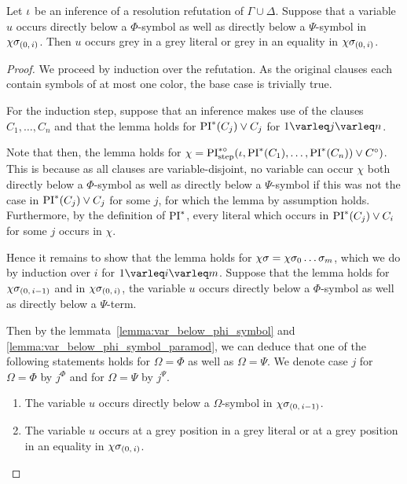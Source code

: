 \documentclass[,%
	draft=false,%
	numbers=noendperiod
	12pt,
	a4paper,
	oneside,%
	openany,
]{memoir}
\newcommand{\inv}{\ensuremath{\chi}}
\begin{document}
\begin{lemma}
	\label{lemma:col_change}
	Let $\iota$ be an inference of a resolution refutation of $\Gamma \cup \Delta$.
	Suppose that a variable $u$ occurs directly below a $\Phi$-symbol as well as directly below a $\Psi$-symbol in $\inv\sigmazi$.
	Then $u$ occurs grey in a grey literal or grey in an equality in $\inv\sigmazi$.
\end{lemma}
\begin{proof}
	We proceed by induction over the refutation.
	As the original clauses each contain symbols of at most one color, the base case is trivially true.

	For the induction step, suppose that an inference makes use of the clauses $C_1, \dots, C_n$ and that the lemma holds for $\operatorname{PI}^*(C_j) \lor C_j$ for $1\varleq j \varleq n$. 

	Note that then, the lemma holds for $\inv = \PIstepstarnosigma(\inference, \PI^*(C_1), \dots, \PI^*(C_n)) \lor C\nosigma)$.
	This is because as all clauses are variable-disjoint, no variable can occur $\inv$ both directly below a $\Phi$-symbol as well as directly below a $\Psi$-symbol if this was not the case in $\operatorname{PI}^*(C_j) \lor C_j$ for some $j$, for which the lemma by assumption holds.
	Furthermore, by the definition of $\operatorname{PI}^*$, every literal which occurs in $\operatorname{PI}^*(C_j) \lor C_i$ for some $j$ occurs in $\inv$.

	Hence it remains to show that the lemma holds for $\inv\sigma = \inv\sigma_0\quantifierdots\sigma_m$, which we do by induction over $i$ for $1\varleq i \varleq m$.
	Suppose that the lemma holds for $\inv\sigmazmi$ and in $\inv\sigmazi$, the variable $u$ occurs directly below a $\Phi$-symbol as well as directly below a $\Psi$-term.

	Then by the lemmata~\ref{lemma:var_below_phi_symbol} and \ref{lemma:var_below_phi_symbol_paramod}, we can deduce that one of the following statements holds for $\Omega = \Phi$ as well as $\Omega = \Psi$. We denote case $j$ for $\Omega = \Phi$ by $j^\Phi$ and for $\Omega = \Psi$ by $j^\Psi$.

\begin{enumerate}
		\item
			\label{16_1}
			The variable $u$ occurs directly below a $\Omega$-symbol in $\inv\sigmazmi$.

		\item
			\label{16_4}
			The variable $u$ occurs at a grey position in a grey literal or at a grey position in an equality in $\inv\sigmazi$.


\end{enumerate}
\end{proof}
\end{document}
